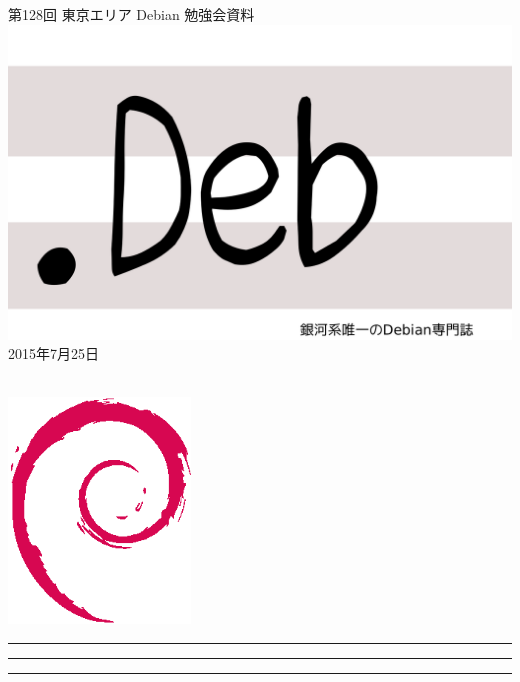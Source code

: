 \documentclass[mingoth,a4paper]{jsarticle}
\newcommand{\debmtgyear}{2015}
\newcommand{\debmtgmonth}{7}
\newcommand{\debmtgdate}{25}
\newcommand{\debmtgnumber}{128}
\begin{document}
\begin{titlepage}
\thispagestyle{empty}

\vspace*{-2cm}
第\debmtgnumber{}回 東京エリア Debian 勉強会資料\\
\hspace*{-2cm}
\includegraphics{image2012-natsu/dotdeb.pdf}\\
\hfill{}\debmtgyear{}年\debmtgmonth{}月\debmtgdate{}日

\\

\vspace*{-2cm}
\hfill{}\includegraphics[height=6cm]{image200502/openlogo-nd.eps}
\end{titlepage}

\newpage

\begin{minipage}[b]{0.2\hsize}
 \colorbox{titleback}{}
\end{minipage}
\begin{minipage}[b]{0.8\hsize}
\hrule
\vspace{2mm}
\hrule
\begin{multicols}{2}
\tableofcontents
\end{multicols}
\vspace{2mm}
\hrule
\end{minipage}
\end{document}
